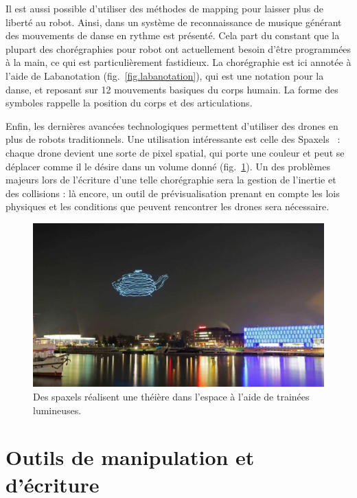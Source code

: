 \documentclass[french,12pt]{article}
\begin{document}
Il est aussi possible d'utiliser des méthodes de mapping pour laisser plus de liberté au robot. Ainsi, dans \cite{seo_autonomous_2013} un système de reconnaissance de musique générant des mouvements de danse en rythme est présenté. Cela part du constant que la plupart des chorégraphies pour robot ont actuellement besoin d'être programmées à la main, ce qui est particulièrement fastidieux. La chorégraphie est ici annotée à l'aide de Labanotation (fig.~\ref{fig.labanotation}), qui est une notation pour la danse, et reposant sur 12 mouvements basiques du corps humain. La forme des symboles rappelle la position du corps et des articulations.

Enfin, les dernières avancées technologiques permettent d'utiliser des drones en plus de robots traditionnels. Une utilisation intéressante est celle des Spaxels~\cite{hortner_spaxels_2012} : chaque drone devient une sorte de pixel spatial, qui porte une couleur et peut se déplacer comme il le désire dans un volume donné (fig.~\ref{fig.spaxels}).   
Un des problèmes majeurs lors de l'écriture d'une telle chorégraphie sera la gestion de l'inertie et des collisions : là encore, un outil de prévisualisation prenant en compte les lois physiques et les conditions que peuvent rencontrer les drones sera nécessaire.

\begin{figure}[h]
    \centering
    \includegraphics[scale=0.25]{images/spaxels.jpg}
    \caption{Des spaxels réalisent une théière dans l'espace à l'aide de trainées lumineuses.}
    \label{fig.spaxels}
\end{figure}

\newpage
\section{Outils de manipulation et d'écriture}
\end{document}
